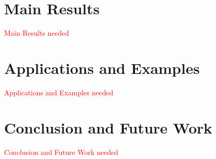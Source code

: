 \documentclass[letterpaper, 10 pt, conference]{ieeeconf}
\providecommand{\note}{\textcolor{red}} %
\begin{document}
\section{Main Results} \label{sec:mainResults}
\note{Main Results needed} 


\section{Applications and Examples} \label{sec:applicationsAndExamples}
\note{Applications and Examples needed}

\section{Conclusion and Future Work} \label{sec:conclusionAndFutureWork}
\note{Conclusion and Future Work needed}

%

\end{document}
